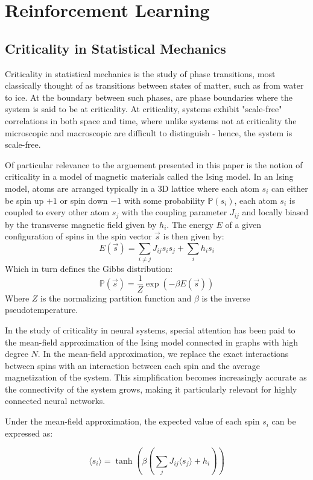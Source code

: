 \section{Reinforcement Learning}


\subsection{Criticality in Statistical Mechanics}

Criticality in statistical mechanics is the study of phase transitions, most classically thought of as transitions between states of matter, such as from water to ice. At the boundary between such phases, are phase boundaries where the system is said to be at criticality. At criticality, systems exhibit "scale-free" correlations in both space and time, where unlike systems not at criticality the microscopic and macroscopic are difficult to distinguish - hence, the system is scale-free.

Of particular relevance to the arguement presented in this paper is the notion of criticality in a model of magnetic materials called the Ising model. In an Ising model, atoms are arranged typically in a 3D lattice where each atom $s_i$ can either be spin up $+1$ or spin down $-1$ with some probability $\mathbb{P}(s_i)$, each atom $s_i$ is coupled to every other atom $s_j$ with the coupling parameter $J_{ij}$ and locally biased by the transverse magnetic field given by $h_i$. The energy $E$ of a given configuration of spins in the spin vector $\vec{s}$ is then given by:$$E(\vec{s}) = \sum_{i\neq j} J_{ij} s_is_j + \sum_i h_is_i$$ Which in turn defines the Gibbs distribution:$$\mathbb{P}(\vec{s})=\dfrac{1}{Z}\exp(-\beta E(\vec{s}))$$Where $Z$ is the normalizing partition function and $\beta$ is the inverse pseudotemperature.

In the study of criticality in neural systems, special attention has been paid to the mean-field approximation of the Ising model connected in graphs with high degree $N$. In the mean-field approximation, we replace the exact interactions between spins with an interaction between each spin and the average magnetization of the system. This simplification becomes increasingly accurate as the connectivity of the system grows, making it particularly relevant for highly connected neural networks.

Under the mean-field approximation, the expected value of each spin $s_i$ can be expressed as:

$$\langle s_i \rangle = \tanh(\beta(\sum_j J_{ij}\langle s_j \rangle + h_i))$$

